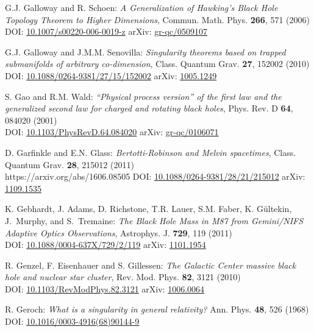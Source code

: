 \begin{thebibliography}{123}
G.J. Galloway and R. Schoen:
{\em A Generalization of Hawking’s Black Hole Topology Theorem to Higher Dimensions},
Commun. Math. Phys. {\bf 266}, 571 (2006)\\
DOI: \href{https://doi.org/10.1007/s00220-006-0019-z}{10.1007/s00220-006-0019-z}\hfill
arXiv: \href{https://arxiv.org/abs/gr-qc/0509107}{gr-qc/0509107}

G.J. Galloway and  J.M.M. Senovilla:
{\em Singularity theorems based on trapped submanifolds of arbitrary co-dimension},
Class. Quantum Grav. {\bf 27}, 152002 (2010)\\
DOI: \href{https://doi.org/10.1088/0264-9381/27/15/152002}{10.1088/0264-9381/27/15/152002}\hfill
arXiv: \href{https://arxiv.org/abs/1005.1249}{1005.1249}

S. Gao and R.M. Wald:
{\em ``Physical process version'' of the first law and the generalized second law for charged and rotating black holes},
Phys. Rev. D {\bf 64}, 084020 (2001)\\
DOI: \href{https://doi.org/10.1103/PhysRevD.64.084020}{10.1103/PhysRevD.64.084020}\hfill
arXiv: \href{https://arxiv.org/abs/gr-qc/0106071}{gr-qc/0106071}

D. Garfinkle and E.N. Glass:
{\em Bertotti-Robinson and Melvin spacetimes},
Class. Quantum Grav. {\bf 28}, 215012 (2011)\\https://arxiv.org/abs/1606.08505
DOI: \href{https://doi.org/10.1088/0264-9381/28/21/215012}{10.1088/0264-9381/28/21/215012}\hfill
arXiv: \href{https://arxiv.org/abs/1109.1535}{1109.1535}

K. Gebhardt, J. Adams, D. Richstone, T.R. Lauer, S.M. Faber, K. Gültekin, J.~Murphy, and S.~Tremaine:
{\em The Black Hole Mass in M87 from Gemini/NIFS Adaptive Optics Observations},
Astrophys. J. {\bf 729}, 119 (2011)\\
DOI: \href{https://doi.org/10.1088/0004-637X/729/2/119}{10.1088/0004-637X/729/2/119}\hfill
arXiv: \href{https://arxiv.org/abs/1101.1954}{1101.1954}

R. Genzel, F. Eisenhauer and S. Gillessen:
{\em The Galactic Center massive black hole and nuclear star cluster},
Rev. Mod. Phys. {\bf 82}, 3121 (2010)\\
DOI: \href{https://doi.org/10.1103/RevModPhys.82.3121}{10.1103/RevModPhys.82.3121}\hfill
arXiv: \href{https://arxiv.org/abs/1006.0064}{1006.0064}

R. Geroch:
{\em What is a singularity in general relativity?}
Ann. Phys. {\bf 48}, 526 (1968)\\
DOI: \href{https://doi.org/10.1016/0003-4916(68)90144-9}{10.1016/0003-4916(68)90144-9}


\end{thebibliography}
